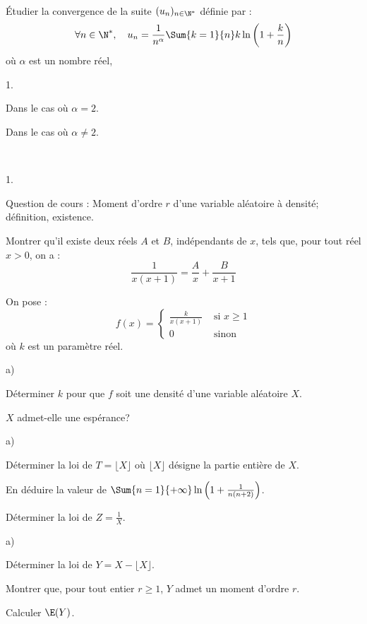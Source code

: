 \documentclass[11pt]{article}%
\begin{document}
\begin{exerciceSP}~\\
  Étudier la convergence de la suite $(u_n)_{n \in \N^* }$ définie par :
  \[
  \forall n \in \N^*,\ \ \ u_n = \frac{1}{n^{\alpha}} \Sum{k=1}{n} k
  \ln \left( 1 + \frac{k}{n} \right)
  \]
  où $\alpha$ est un nombre réel, \begin{noliste}{1.}
    \setlength{\itemsep}{2mm}
  \item Dans le cas où $\alpha = 2$.
  \item Dans le cas où $\alpha \neq 2$.

  \end{noliste}
\end{exerciceSP}


\newpage


\begin{exerciceAP}~
  \begin{noliste}{1.}
    \setlength{\itemsep}{2mm}
  \item Question de cours : Moment d'ordre $r$ d'une variable
    aléatoire à densité; définition, existence.
  \item Montrer qu'il existe deux réels $A$ et $B$, indépendants de
    $x$, tels que, pour tout réel $x > 0$, on a :
    \[
    \frac{1}{x (x+1)} = \frac{A}{x} + \frac{B}{x+1}
    \]
  \item On pose :
    \[
    f(x) = \left\{ 
      \begin{array}{cc} 
        \frac{k}{x(x+1)} & \text{ si } x \geq 1 \\ 
        0 & \text{ sinon } 
      \end{array} 
    \right.
    \]
    où $k$ est un paramètre réel. \begin{noliste}{a)}
    \setlength{\itemsep}{2mm}
    \item Déterminer $k$ pour que $f$ soit une densité d'une variable
      aléatoire $X$.
    \item $X$ admet-elle une espérance?
    \end{noliste}
  \item
    \begin{noliste}{a)}
    \setlength{\itemsep}{2mm}
    \item Déterminer la loi de $T = \lfloor X \rfloor$ où $\lfloor X
      \rfloor$ désigne la partie entière de $X$.
    \item En déduire la valeur de $\Sum{n=1}{+\infty} \ln \left( 1 +
        \frac{1}{n(n+2) } \right)$.
    \end{noliste}
  \item Déterminer la loi de $Z = \frac{1}{X}$. 
  \item
    \begin{noliste}{a)}
    \setlength{\itemsep}{2mm}
    \item Déterminer la loi de $Y = X - \lfloor X \rfloor$. 
    \item Montrer que, pour tout entier $r \geq 1$, $Y$ admet un
      moment d'ordre $r$.
    \item Calculer $\E(Y)$. 
    \end{noliste} 
  \end{noliste}
\end{exerciceAP}
\end{document}
